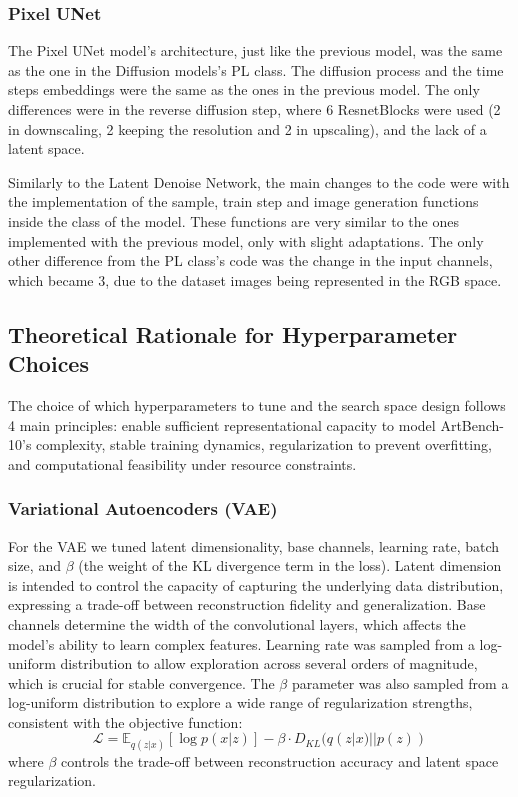 \documentclass[runningheads]{llncs}
\begin{document}
\subsubsection{Pixel UNet}

The Pixel UNet model's architecture, just like the previous model, was the same as the one in the Diffusion models's PL class.
The diffusion process and the time steps embeddings were the same as the ones in the previous model.
The only differences were in the reverse diffusion step, where 6 ResnetBlocks were used (2 in downscaling, 2 keeping the resolution and 2 in upscaling), 
and the lack of a latent space.

Similarly to the Latent Denoise Network, the main changes to the code were with the implementation of the sample, train step and image generation functions inside the class of the model.
These functions are very similar to the ones implemented with the previous model, only with slight adaptations.
The only other difference from the PL class's code was the change in the input channels, which became 3, due to the dataset images being represented in the RGB space.

\subsection{Theoretical Rationale for Hyperparameter Choices}
The choice of which hyperparameters to tune and the search space design follows 4 main principles:
enable sufficient representational capacity to model ArtBench-10's complexity, stable training dynamics,
regularization to prevent overfitting, and computational feasibility under resource constraints. 

\subsubsection{Variational Autoencoders (VAE)}
For the VAE we tuned latent dimensionality, base channels, learning rate, batch size, and $\beta$ (the weight of the KL divergence term in the loss).
Latent dimension is intended to control the capacity of capturing the underlying data distribution, expressing a trade-off between reconstruction fidelity and generalization.
Base channels determine the width of the convolutional layers, which affects the model's ability to learn complex features.
Learning rate was sampled from a log-uniform distribution to allow exploration across several orders of magnitude, which is crucial for stable convergence.
The $\beta$ parameter was also sampled from a log-uniform distribution to explore a wide range of regularization strengths, consistent with the objective function:
\begin{equation}
    \mathcal{L} = \mathbb{E}_{q(z|x)}[\log p(x|z)] - \beta \cdot D_{KL}(q(z|x) || p(z))
\end{equation}
where $\beta$ controls the trade-off between reconstruction accuracy and latent space regularization.
\end{document}
